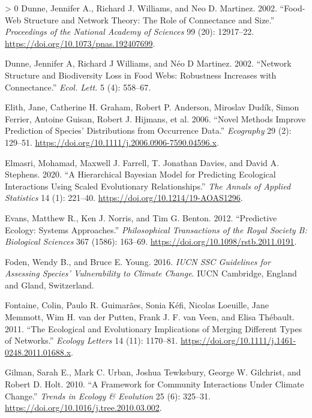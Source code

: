 \documentclass[10pt,oneside]{article}
\newlength{\cslhangindent}
\newenvironment{CSLReferences}[3] %
 {%
  \setlength{\parindent}{0pt}
  \ifodd #1 \everypar{\setlength{\hangindent}{\cslhangindent}}\ignorespaces\fi
  \ifnum #2 > 0
  \setlength{\parskip}{#2\baselineskip}
  \fi
 }%
 {}
\begin{document}
\begin{CSLReferences}{1}{0}
\leavevmode\hypertarget{ref-Dunne2002FooStr}{}%
Dunne, Jennifer A., Richard J. Williams, and Neo D. Martinez. 2002.
{``Food-Web Structure and Network Theory: The Role of Connectance and
Size.''} \emph{Proceedings of the National Academy of Sciences} 99 (20):
12917--22. \url{https://doi.org/10.1073/pnas.192407699}.

\leavevmode\hypertarget{ref-Dunne2002NetStr}{}%
Dunne, Jennifer A, Richard J Williams, and Néo D Martinez. 2002.
{``Network Structure and Biodiversity Loss in Food Webs: Robustness
Increases with Connectance.''} \emph{Ecol. Lett.} 5 (4): 558--67.

\leavevmode\hypertarget{ref-Elith2006NovMet}{}%
Elith, Jane, Catherine H. Graham, Robert P. Anderson, Miroslav Dudík,
Simon Ferrier, Antoine Guisan, Robert J. Hijmans, et al. 2006. {``Novel
Methods Improve Prediction of Species' Distributions from Occurrence
Data.''} \emph{Ecography} 29 (2): 129--51.
\url{https://doi.org/10.1111/j.2006.0906-7590.04596.x}.

\leavevmode\hypertarget{ref-Elmasri2020HieBay}{}%
Elmasri, Mohamad, Maxwell J. Farrell, T. Jonathan Davies, and David A.
Stephens. 2020. {``A Hierarchical Bayesian Model for Predicting
Ecological Interactions Using Scaled Evolutionary Relationships.''}
\emph{The Annals of Applied Statistics} 14 (1): 221--40.
\url{https://doi.org/10.1214/19-AOAS1296}.

\leavevmode\hypertarget{ref-Evans2012PreEco}{}%
Evans, Matthew R., Ken J. Norris, and Tim G. Benton. 2012. {``Predictive
Ecology: Systems Approaches.''} \emph{Philosophical Transactions of the
Royal Society B: Biological Sciences} 367 (1586): 163--69.
\url{https://doi.org/10.1098/rstb.2011.0191}.

\leavevmode\hypertarget{ref-Foden2016IucSsc}{}%
Foden, Wendy B., and Bruce E. Young. 2016. \emph{IUCN SSC Guidelines for
Assessing Species' Vulnerability to Climate Change}. IUCN Cambridge,
England and Gland, Switzerland.

\leavevmode\hypertarget{ref-Fontaine2011EcoEvo}{}%
Fontaine, Colin, Paulo R. Guimarães, Sonia Kéfi, Nicolas Loeuille, Jane
Memmott, Wim H. van der Putten, Frank J. F. van Veen, and Elisa
Thébault. 2011. {``The Ecological and Evolutionary Implications of
Merging Different Types of Networks.''} \emph{Ecology Letters} 14 (11):
1170--81. \url{https://doi.org/10.1111/j.1461-0248.2011.01688.x}.

\leavevmode\hypertarget{ref-Gilman2010FraCom}{}%
Gilman, Sarah E., Mark C. Urban, Joshua Tewksbury, George W. Gilchrist,
and Robert D. Holt. 2010. {``A Framework for Community Interactions
Under Climate Change.''} \emph{Trends in Ecology \& Evolution} 25 (6):
325--31. \url{https://doi.org/10.1016/j.tree.2010.03.002}.


\end{CSLReferences}
\end{document}
